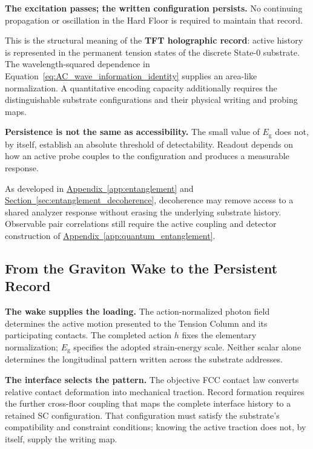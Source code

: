 \noindent\textbf{The excitation passes; the written configuration persists.}
No continuing propagation or oscillation in the Hard Floor is required to maintain that record.

This is the structural meaning of the \textbf{TFT holographic record}: active history is represented in the permanent tension states of the discrete State-0 substrate. The wavelength-squared dependence in Equation~\eqref{eq:AC_wave_information_identity} supplies an area-like normalization. A quantitative encoding capacity additionally requires the distinguishable substrate configurations and their physical writing and probing maps.

\medskip
\noindent\textbf{Persistence is not the same as accessibility.}
The small value of $E_{\mathrm g}$ does not, by itself, establish an absolute threshold of detectability. Readout depends on how an active probe couples to the configuration and produces a measurable response.

As developed in \hyperref[app:entanglement]{Appendix~\ref*{app:entanglement}} and \hyperref[sec:entanglement_decoherence]{Section~\ref*{sec:entanglement_decoherence}}, decoherence may remove access to a shared analyzer response without erasing the underlying substrate history. Observable pair correlations still require the active coupling and detector construction of \hyperref[app:quantum_entanglement]{Appendix~\ref*{app:quantum_entanglement}}.

\subsection{From the Graviton Wake to the Persistent Record}
\label{sec:AC_wake_to_record}

\noindent\textbf{The wake supplies the loading.}
The action-normalized photon field determines the active motion presented to the Tension Column and its participating contacts. The completed action $h$ fixes the elementary normalization; $E_{\mathrm g}$ specifies the adopted strain-energy scale. Neither scalar alone determines the longitudinal pattern written across the substrate addresses.

\medskip
\noindent\textbf{The interface selects the pattern.}
The objective FCC contact law converts relative contact deformation into mechanical traction. Record formation requires the further cross-floor coupling that maps the complete interface history to a retained SC configuration. That configuration must satisfy the substrate's compatibility and constraint conditions; knowing the active traction does not, by itself, supply the writing map.


